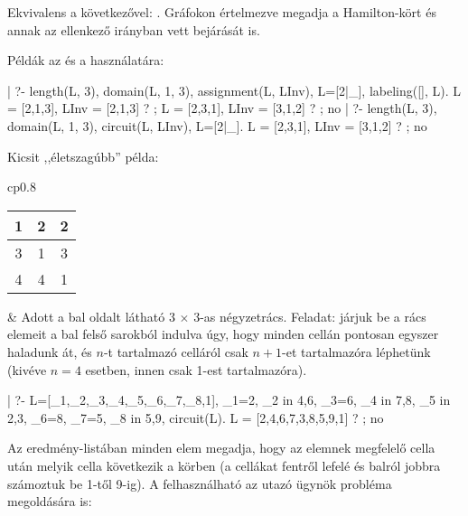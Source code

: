\medskip

{}

Ekvivalens a következővel: . Gráfokon értelmezve
megadja a Hamilton-kört és annak az ellenkező irányban vett bejárását is.

Példák az  és a  használatára:

\begin{prologcode}
| ?- length(L, 3), domain(L, 1, 3), assignment(L, LInv), L=[2|_],
     labeling([], L).
L = [2,1,3], LInv = [2,1,3] ? ;
L = [2,3,1], LInv = [3,1,2] ? ;
no
| ?- length(L, 3), domain(L, 1, 3), circuit(L, LInv), L=[2|_].
L = [2,3,1], LInv = [3,1,2] ? ;
no
\end{prologcode}

Kicsit ,,életszagúbb'' példa:

\medskip

\begin{tabular}{cp{}}
\begin{tabular}{|c|c|c|}
\hline 1 & 2 & 2 \\ \hline 3 & 1 & 3 \\ \hline 4 & 4 & 1 \\ \hline
\end{tabular} &
\vspace{-1.5\baselineskip}
Adott a bal oldalt látható 3 $\times$ 3-as négyzetrács. Feladat: járjuk be
a rács elemeit a bal felső sarokból indulva úgy, hogy minden cellán pontosan
egyszer haladunk át, és $n$-t tartalmazó celláról csak $n+1$-et tartalmazóra
léphetünk (kivéve $n=4$ esetben, innen csak 1-est tartalmazóra). \\
\end{tabular}

\begin{prologcode}
| ?- L=[_1,_2,_3,_4,_5,_6,_7,_8,1], _1=2, _2 in {4,6}, _3=6,
     _4 in {7,8}, _5 in {2,3}, _6=8, _7=5, _8 in {5,9},
     circuit(L).
L = [2,4,6,7,3,8,5,9,1] ? ; no
\end{prologcode}

Az eredmény-listában minden elem megadja, hogy az elemnek megfelelő cella után
melyik cella következik a körben (a cellákat fentről lefelé és balról jobbra
számoztuk be 1-től 9-ig).
\br
A  felhasználható az utazó ügynök probléma megoldására is:

